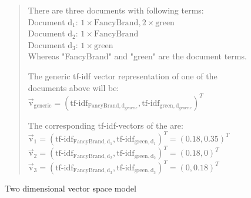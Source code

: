 \begin{figure}[h]

    \begin{quote}
        There are three documents with following terms:\\
        Document $\text{d}_1$: $1\times \text{FancyBrand}, 2\times \text{green}$\\
        Document $\text{d}_2$: $1\times \text{FancyBrand}$\\
        Document $\text{d}_3$: $1\times \text{green}$\\
        Whereas "FancyBrand" and "green" are the document terms.

        \noindent
        The generic tf-idf vector representation of one of the documents above will be:\\
        $\vec{\text{v}}_{\text{generic}} = (\text{tf-idf}_{\text{FancyBrand},\text{d}_\text{generic}}, \text{tf-idf}_{\text{green},\text{d}_\text{generic}})^T$

        \noindent
        The corresponding tf-idf-vectors of the are:\\
        $\vec{\text{v}}_1 = (\text{tf-idf}_{\text{FancyBrand},\text{d}_1}, \text{tf-idf}_{\text{green},\text{d}_1})^T = (0.18, 0.35)^T$\\
        $\vec{\text{v}}_2 = (\text{tf-idf}_{\text{FancyBrand},\text{d}_2}, \text{tf-idf}_{\text{green},\text{d}_2})^T = (0.18, 0)^T$\\
        $\vec{\text{v}}_3 = (\text{tf-idf}_{\text{FancyBrand},\text{d}_3}, \text{tf-idf}_{\text{green},\text{d}_3})^T = (0, 0.18)^T$\\
    \end{quote}

    \center

    \caption{Two dimensional vector space model}
    \label{fig:vectorspacemodel}
\end{figure}




